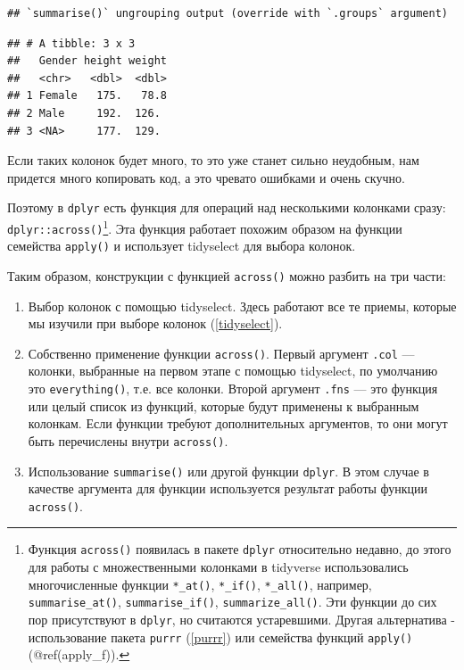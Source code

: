 \documentclass[]{book}
\providecommand{\tightlist}{%
  \setlength{\itemsep}{0pt}\setlength{\parskip}{0pt}}
\begin{document}
\begin{verbatim}
## `summarise()` ungrouping output (override with `.groups` argument)
\end{verbatim}

\begin{verbatim}
## # A tibble: 3 x 3
##   Gender height weight
##   <chr>   <dbl>  <dbl>
## 1 Female   175.   78.8
## 2 Male     192.  126. 
## 3 <NA>     177.  129.
\end{verbatim}

Если таких колонок будет много, то это уже станет сильно неудобным, нам
придется много копировать код, а это чревато ошибками и очень скучно.

Поэтому в \texttt{dplyr} есть функция для операций над несколькими
колонками сразу: \texttt{dplyr::across()}\footnote{Функция
  \texttt{across()} появилась в пакете \texttt{dplyr} относительно
  недавно, до этого для работы с множественными колонками в tidyverse
  использовались многочисленные функции \texttt{*\_at()},
  \texttt{*\_if()}, \texttt{*\_all()}, например,
  \texttt{summarise\_at()}, \texttt{summarise\_if()},
  \texttt{summarize\_all()}. Эти функции до сих пор присутствуют в
  \texttt{dplyr}, но считаются устаревшими. Другая альтернатива -
  использование пакета \texttt{purrr} (\ref{purrr}) или семейства
  функций \texttt{apply()} (@ref(apply\_f)).}. Эта функция работает
похожим образом на функции семейства \texttt{apply()} и использует
tidyselect для выбора колонок.

Таким образом, конструкции с функцией \texttt{across()} можно разбить на
три части:

\begin{enumerate}
\def\labelenumi{\arabic{enumi}.}
\tightlist
\item
  Выбор колонок с помощью tidyselect. Здесь работают все те приемы,
  которые мы изучили при выборе колонок (\ref{tidyselect}).
\item
  Собственно применение функции \texttt{across()}. Первый аргумент
  \texttt{.col} --- колонки, выбранные на первом этапе с помощью
  tidyselect, по умолчанию это \texttt{everything()}, т.е. все колонки.
  Второй аргумент \texttt{.fns} --- это функция или целый список из
  функций, которые будут применены к выбранным колонкам. Если функции
  требуют дополнительных аргументов, то они могут быть перечислены
  внутри \texttt{across()}.
\item
  Использование \texttt{summarise()} или другой функции \texttt{dplyr}.
  В этом случае в качестве аргумента для функции используется результат
  работы функции \texttt{across()}.
\end{enumerate}
\end{document}
